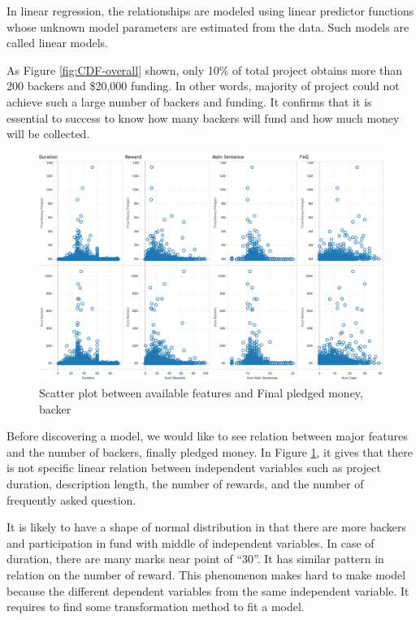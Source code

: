 In linear regression, the relationships are modeled using linear predictor functions whose unknown model parameters are estimated from the data. Such models are called linear models.

As Figure \ref{fig:CDF-overall} shown, only 10\% of total project obtains more than 200 backers and \$20,000 funding. In other words, majority of project could not achieve such a large number of backers and funding. It confirms that it is essential to success to know how many backers will fund and how much money will be collected.

\begin{figure}[!ht]
\centering
  \includegraphics[width=1\textwidth]{figs/scatter_money_backer}
    \caption{Scatter plot between available features and Final pledged money, backer}
  \label{fig:scatterMoneyBacker}
\end{figure}

Before discovering a model, we would like to see relation between major features and the number of backers, finally pledged money. In Figure \ref{fig:scatterMoneyBacker}, it gives that there is not specific linear relation between independent variables such as project duration, description length, the number of rewards, and the number of frequently asked question.

It is likely to have a shape of normal distribution in that there are more backers and participation in fund with middle of independent variables. In case of duration, there are many marks near point of ``30''. It has similar pattern in relation on the number of reward. This phenomenon makes hard to make model because the different dependent variables from the same independent variable. It requires to find some transformation method to fit a model.


